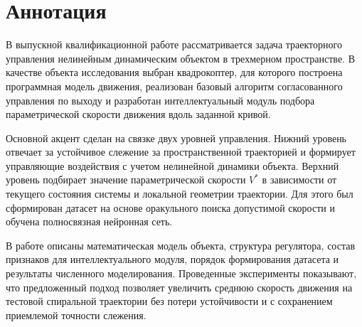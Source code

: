 \section*{Аннотация}

В выпускной квалификационной работе рассматривается задача траекторного управления нелинейным динамическим объектом в трехмерном пространстве. В качестве объекта исследования выбран квадрокоптер, для которого построена программная модель движения, реализован базовый алгоритм согласованного управления по выходу и разработан интеллектуальный модуль подбора параметрической скорости движения вдоль заданной кривой.

Основной акцент сделан на связке двух уровней управления. Нижний уровень отвечает за устойчивое слежение за пространственной траекторией и формирует управляющие воздействия с учетом нелинейной динамики объекта. Верхний уровень подбирает значение параметрической скорости $V^{\ast}$ в зависимости от текущего состояния системы и локальной геометрии траектории. Для этого был сформирован датасет на основе оракульного поиска допустимой скорости и обучена полносвязная нейронная сеть.

В работе описаны математическая модель объекта, структура регулятора, состав признаков для интеллектуального модуля, порядок формирования датасета и результаты численного моделирования. Проведенные эксперименты показывают, что предложенный подход позволяет увеличить среднюю скорость движения на тестовой спиральной траектории без потери устойчивости и с сохранением приемлемой точности слежения.

\newpage
